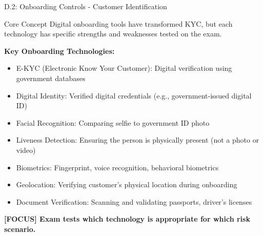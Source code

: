 \documentclass[11pt,a4paper]{beamer}
\newcommand{\examfocus}[1]{\textcolor{orange!80!black}{\textbf{[FOCUS] #1}}}
\begin{document}
\begin{frame}{D.2: Onboarding Controls - Customer Identification}
	\begin{block}{Core Concept}
		Digital onboarding tools have transformed KYC, but each technology has specific strengths and weaknesses tested on the exam.
	\end{block}
	\textbf{Key Onboarding Technologies:}
	\begin{itemize}
		\item E-KYC (Electronic Know Your Customer): Digital verification using government databases
		\item Digital Identity: Verified digital credentials (e.g., government-issued digital ID)
		\item Facial Recognition: Comparing selfie to government ID photo
		\item Liveness Detection: Ensuring the person is physically present (not a photo or video)
		\item Biometrics: Fingerprint, voice recognition, behavioral biometrics
		\item Geolocation: Verifying customer's physical location during onboarding
		\item Document Verification: Scanning and validating passports, driver's licenses
	\end{itemize}
	\examfocus{Exam tests which technology is appropriate for which risk scenario.}
\end{frame}
\end{document}
